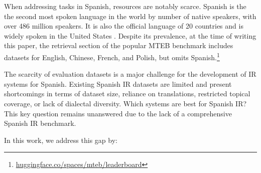 \documentclass[11pt]{article}
\begin{document}
When addressing tasks in Spanish, resources are notably scarce. Spanish is the the second most spoken language in the world by number of native speakers, with over 486 million speakers. It is also the official language of 20 countries and is widely spoken in the United States \citep{eberhard2024ethnologue}. Despite its prevalence, at the time of writing this paper, the retrieval section of the popular MTEB benchmark \citep{muennighoff-etal-2023-mteb} includes datasets for English, Chinese, French, and Polish, but omits Spanish.\footnote{\href{https://huggingface.co/spaces/mteb/leaderboard}{huggingface.co/spaces/mteb/leaderboard}}

The scarcity of evaluation datasets is a major challenge for the development of IR systems for Spanish. 
Existing Spanish IR datasets are limited and present shortcomings in terms of dataset size, reliance on translations, restricted topical coverage, or lack of dialectal diversity.
Which systems are best for Spanish IR? 
This key question remains unanswered due to the lack of a comprehensive Spanish IR benchmark.


In this work, we address this gap by:
\end{document}
